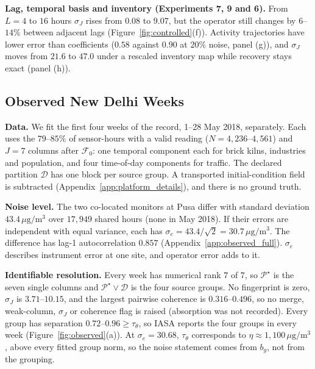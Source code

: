 \noindent\textbf{Lag, temporal basis and inventory (Experiments 7, 9 and 6).}
From \(L=4\) to \(16\) hours \(\sigma_J\) rises from \(0.08\) to \(9.07\), but the operator
still changes by \(6\)--\(14\%\) between adjacent lags (Figure~\ref{fig:controlled}(f)).
Activity trajectories have lower error than coefficients (\(0.58\) against \(0.90\) at
\(20\%\) noise, panel (g)), and \(\sigma_J\) moves from \(21.6\) to \(47.0\) under a
rescaled inventory map while recovery stays exact (panel (h)).

\subsection{Observed New Delhi Weeks}
\label{subsec:observed_results}

\noindent\textbf{Data.}
We fit the first four weeks of the record, 1--28 May 2018, separately.  Each uses the
\(79\)--\(85\%\) of sensor-hours with a valid reading (\(N=4{,}236\)--\(4{,}561\)) and
\(J=7\) columns after \(\mathcal F_0\): one temporal component each for brick kilns,
industries and population, and four time-of-day components for traffic.  The declared
partition \(\mathcal D\) has one block per source group.  A transported
initial-condition field is subtracted (Appendix~\ref{app:platform_details}), and there
is no ground truth.

\noindent\textbf{Noise level.}
The two co-located monitors at Pusa differ with standard deviation
\(43.4\,\mu\mathrm g/\mathrm m^3\) over \(17{,}949\) shared hours (none in May 2018).  If
their errors are independent with equal variance, each has
\(\sigma_e=43.4/\sqrt2=30.7\,\mu\mathrm g/\mathrm m^3\).  The difference has lag-1
autocorrelation \(0.857\) (Appendix~\ref{app:observed_full}).  \(\sigma_e\) describes
instrument error at one site, and operator error adds to it.

\noindent\textbf{Identifiable resolution.}
Every week has numerical rank \(7\) of \(7\), so \(\mathcal P^\star\) is the seven
single columns and \(\mathcal P^\star\vee\mathcal D\) is the four source groups.  No
fingerprint is zero, \(\sigma_J\) is \(3.71\)--\(10.15\), and the largest pairwise
coherence is \(0.316\)--\(0.496\), so no merge, weak-column, \(\sigma_J\) or coherence flag
is raised (absorption was not recorded).  Every group has separation
\(0.72\)--\(0.96\ge\tau_\theta\), so IASA reports the four groups in every week
(Figure~\ref{fig:observed}(a)).  At \(\sigma_e=30.68\), \(\tau_\theta\) corresponds to
\(\eta\approx1{,}100\,\mu\mathrm g/\mathrm m^3\), above every fitted group norm, so the
noise statement comes from \(b_g\), not from the grouping.


